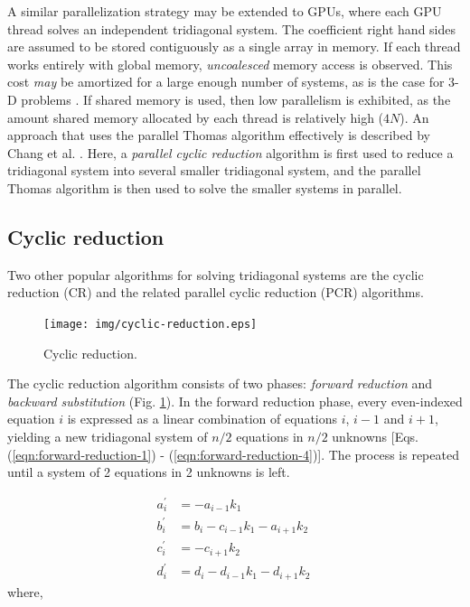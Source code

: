 A similar parallelization strategy may be extended to GPUs,
where each GPU thread solves an independent tridiagonal system.
The coefficient right hand sides are assumed to be stored
contiguously as a single array in memory.
If each thread works entirely with global memory,
\emph{uncoalesced} memory access is observed.
This cost \emph{may} be amortized for a large enough
number of systems, as is the case
for 3-D problems \cite{sakharnykhADIconf}.
If shared memory is used,
then low parallelism is exhibited,
as the amount shared memory allocated by each thread
is relatively high ($4N$).
An approach that uses the parallel Thomas algorithm
effectively is described by Chang et al. \cite{chang2012scalable}.
Here, a \emph{parallel cyclic reduction} algorithm
is first used to reduce a
tridiagonal system into several smaller tridiagonal system,
and the parallel Thomas algorithm is then used to
solve the smaller systems in parallel.

\subsection{Cyclic reduction}

Two other popular algorithms for solving
tridiagonal systems are the
cyclic reduction (CR) and
the related parallel cyclic reduction (PCR)
algorithms.

\begin{figure}
\begin{center}
\texttt{[image: img/cyclic-reduction.eps]}
\end{center}
\caption{Cyclic reduction.}
\label{fig:cyclic-reduction}
\end{figure}

The cyclic reduction algorithm consists of two phases:
\emph{forward reduction} and \emph{backward substitution}
(Fig. \ref{fig:cyclic-reduction}).
In the forward reduction phase,
every even-indexed equation $i$
is expressed as a
linear combination of equations $i$, $i-1$ and $i+1$,
yielding a new tridiagonal system of
$n/2$ equations in $n/2$ unknowns
[Eqs. (\ref{eqn:forward-reduction-1}) - (\ref{eqn:forward-reduction-4})].
The process is repeated until a system of
2 equations in 2 unknowns is left.

\begin{align} 
    a^{\prime}_i &= -a_{i-1}k_1 \
    \label{eqn:forward-reduction-1} \\
    b^{\prime}_i &= b_i - c_{i-1}k_1 - a_{i+1}k_2 \
    \label{eqn:forward-reduction-2} \\
    c^{\prime}_i &= -c_{i+1}k_2 \
    \label{eqn:forward-reduction-3} \\
    d^{\prime}_i &= d_i - d_{i-1}k_1  - d_{i+1}k_2 \
    \label{eqn:forward-reduction-4}
\end{align}
%
where,

